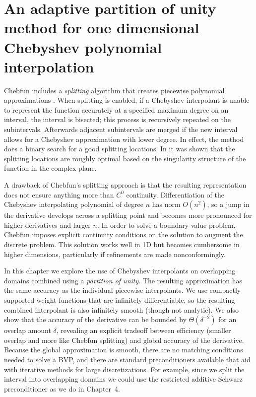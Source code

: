 %
%
\chapter{An adaptive partition of unity method for one dimensional Chebyshev polynomial interpolation}
\label{pu_1d}

 Chebfun includes a \textit{splitting} algorithm that creates piecewise polynomial approximations \cite{pachon2010piecewise}. When splitting is enabled, if a Chebyshev interpolant is unable to represent the function accurately at a specified maximum degree on an interval, the interval is bisected; this process is recursively repeated on the subintervals. Afterwards adjacent subintervals are merged if the new interval allows for a Chebyshev approximation with lower degree. In effect, the method does a binary search for a good splitting locations. In \cite{driscoll2014optimal} it was shown that the splitting locations are roughly optimal based on the singularity structure of the function in the complex plane. 

A drawback of Chebfun's splitting approach is that the resulting representation does not ensure anything more than $C^0$ continuity. Differentiation of the Chebyshev interpolating polynomial of degree $n$ has norm $O(n^2)$, so a jump in the derivative develops across a splitting point and becomes more pronounced for higher derivatives and larger $n$. In order to solve a boundary-value problem, Chebfun imposes explicit continuity conditions on the solution to augment the discrete problem. This solution works well in 1D but becomes cumbersome in higher dimensions, particularly if refinements are made nonconformingly.

In this chapter we explore the use of Chebyshev interpolants on overlapping domains combined using a \emph{partition of unity}. The resulting approximation has the same accuracy as the individual piecewise interpolants. We use compactly supported weight functions that are infinitely differentiable, so the resulting combined interpolant is also infinitely smooth (though not analytic). We also show that the accuracy of the derivative can be bounded by $\Theta(\delta^{-2})$ for an overlap amount $\delta$, revealing an explicit tradeoff between efficiency (smaller overlap and more like Chebfun splitting) and global accuracy of the derivative. Because the global approximation is smooth, there are no matching conditions needed to solve a BVP, and there are standard preconditioners available that aid with iterative methods for large discretizations. For example, since we split the interval into overlapping domains we could use the restricted additive Schwarz preconditioner as we do in Chapter~4.

